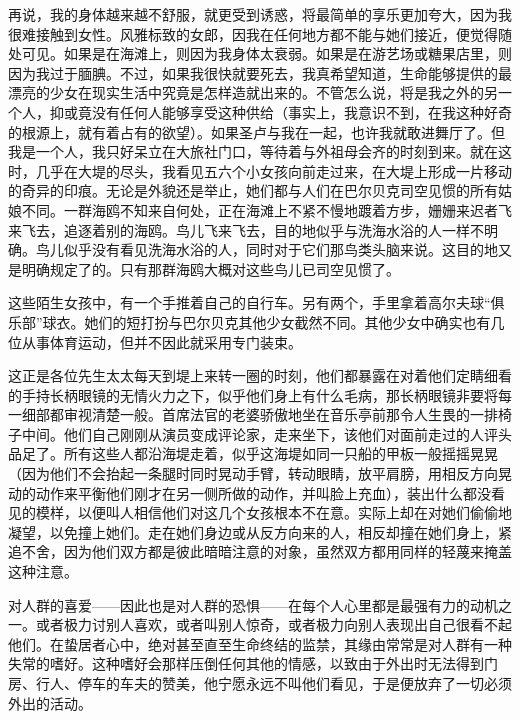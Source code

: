\par 再说，我的身体越来越不舒服，就更受到诱惑，将最简单的享乐更加夸大，因为我很难接触到女性。风雅标致的女郎，因我在任何地方都不能与她们接近，便觉得随处可见。如果是在海滩上，则因为我身体太衰弱。如果是在游艺场或糖果店里，则因为我过于腼腆。不过，如果我很快就要死去，我真希望知道，生命能够提供的最漂亮的少女在现实生活中究竟是怎样造就出来的。不管怎么说，将是我之外的另一个人，抑或竟没有任何人能够享受这种供给（事实上，我意识不到，在我这种好奇的根源上，就有着占有的欲望）。如果圣卢与我在一起，也许我就敢进舞厅了。但我是一个人，我只好呆立在大旅社门口，等待着与外祖母会齐的时刻到来。就在这时，几乎在大堤的尽头，我看见五六个小女孩向前走过来，在大堤上形成一片移动的奇异的印痕。无论是外貌还是举止，她们都与人们在巴尔贝克司空见惯的所有姑娘不同。一群海鸥不知来自何处，正在海滩上不紧不慢地踱着方步，姗姗来迟者飞来飞去，追逐着别的海鸥。鸟儿飞来飞去，目的地似乎与洗海水浴的人一样不明确。鸟儿似乎没有看见洗海水浴的人，同时对于它们那鸟类头脑来说。这目的地又是明确规定了的。只有那群海鸥大概对这些鸟儿已司空见惯了。
\par 这些陌生女孩中，有一个手推着自己的自行车。另有两个，手里拿着高尔夫球“俱乐部”球衣。她们的短打扮与巴尔贝克其他少女截然不同。其他少女中确实也有几位从事体育运动，但并不因此就采用专门装束。
\par 这正是各位先生太太每天到堤上来转一圈的时刻，他们都暴露在对着他们定睛细看的手持长柄眼镜的无情火力之下，似乎他们身上有什么毛病，那长柄眼镜非要将每一细部都审视清楚一般。首席法官的老婆骄傲地坐在音乐亭前那令人生畏的一排椅子中间。他们自己刚刚从演员变成评论家，走来坐下，该他们对面前走过的人评头品足了。所有这些人都沿海堤走着，似乎这海堤如同一只船的甲板一般摇摇晃晃（因为他们不会抬起一条腿时同时晃动手臂，转动眼睛，放平肩膀，用相反方向晃动的动作来平衡他们刚才在另一侧所做的动作，并叫脸上充血），装出什么都没看见的模样，以便叫人相信他们对这几个女孩根本不在意。实际上却在对她们偷偷地凝望，以免撞上她们。走在她们身边或从反方向来的人，相反却撞在她们身上，紧追不舍，因为他们双方都是彼此暗暗注意的对象，虽然双方都用同样的轻蔑来掩盖这种注意。
\par 对人群的喜爱——因此也是对人群的恐惧——在每个人心里都是最强有力的动机之一。或者极力讨别人喜欢，或者叫别人惊奇，或者极力向别人表现出自己很看不起他们。在蛰居者心中，绝对甚至直至生命终结的监禁，其缘由常常是对人群有一种失常的嗜好。这种嗜好会那样压倒任何其他的情感，以致由于外出时无法得到门房、行人、停车的车夫的赞美，他宁愿永远不叫他们看见，于是便放弃了一切必须外出的活动。
